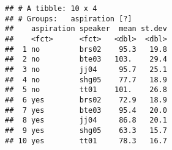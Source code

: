 \documentclass[]{article}
\begin{document}
\begin{verbatim}
## # A tibble: 10 x 4
## # Groups:   aspiration [?]
##    aspiration speaker  mean st.dev
##    <fct>      <fct>   <dbl>  <dbl>
##  1 no         brs02    95.3   19.8
##  2 no         bte03   103.    29.4
##  3 no         jj04     95.7   25.1
##  4 no         shg05    77.7   18.9
##  5 no         tt01    101.    26.8
##  6 yes        brs02    72.9   18.9
##  7 yes        bte03    95.4   20.0
##  8 yes        jj04     86.8   20.1
##  9 yes        shg05    63.3   15.7
## 10 yes        tt01     78.3   16.7
\end{verbatim}
\end{document}

